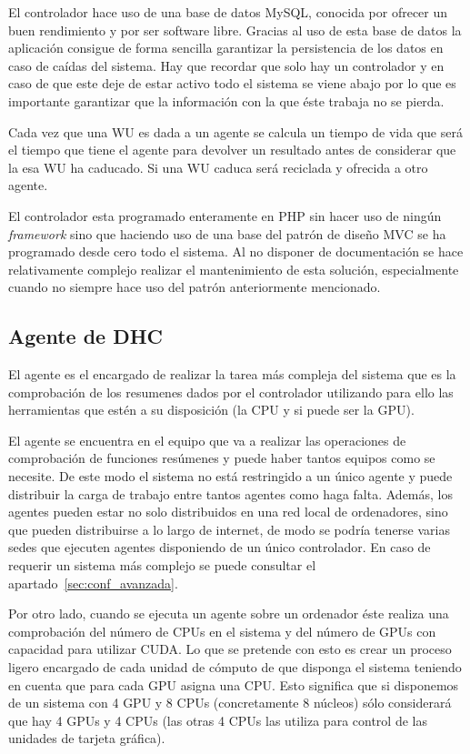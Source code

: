 El controlador hace uso de una base de datos MySQL, conocida por ofrecer un buen rendimiento y por ser software libre. Gracias al uso de esta base de datos la aplicación consigue de forma sencilla garantizar la persistencia de los datos en caso de caídas del sistema. Hay que recordar que solo hay un controlador y en caso de que este deje de estar activo todo el sistema se viene abajo por lo que es importante garantizar que la información con la que éste trabaja no se pierda.

Cada vez que una WU es dada a un agente se calcula un tiempo de vida que será el tiempo que tiene el agente para devolver un resultado antes de considerar que la esa WU ha caducado. Si una WU caduca será reciclada y ofrecida a otro agente.

El controlador esta programado enteramente en PHP sin hacer uso de ningún \emph{framework} sino que haciendo uso de una base del patrón de diseño MVC se ha programado desde cero todo el sistema. Al no disponer de documentación se hace relativamente complejo realizar el mantenimiento de esta solución, especialmente cuando no siempre hace uso del patrón anteriormente mencionado.

\subsection{Agente de DHC}

El agente es el encargado de realizar la tarea más compleja del sistema que es la comprobación de los resumenes dados por el controlador utilizando para ello las herramientas que estén a su disposición (la CPU y si puede ser la GPU).

El agente se encuentra en el equipo que va a realizar las operaciones de comprobación de funciones resúmenes y puede haber tantos equipos como se necesite. De este modo el sistema no está restringido a un único agente y puede distribuir la carga de trabajo entre tantos agentes como haga falta. Además, los agentes pueden estar no solo distribuidos en una red local de ordenadores, sino que pueden distribuirse a lo largo de internet, de modo se podría tenerse varias sedes que ejecuten agentes disponiendo de un único controlador. En caso de requerir un sistema más complejo se puede consultar el apartado~\ref{sec:conf_avanzada}.

Por otro lado, cuando se ejecuta un agente sobre un ordenador éste realiza una comprobación del número de CPUs en el sistema y del número de GPUs con capacidad para utilizar CUDA. Lo que se pretende con esto es crear un proceso ligero encargado de cada unidad de cómputo de que disponga el sistema teniendo en cuenta que para cada GPU asigna una CPU. Esto significa que si disponemos de un sistema con 4 GPU y 8 CPUs (concretamente 8 núcleos) sólo considerará que hay 4 GPUs y 4 CPUs (las otras 4 CPUs las utiliza para control de las unidades de tarjeta gráfica).

